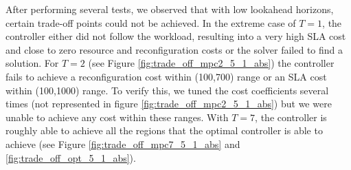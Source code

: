 After performing several tests, we observed that with low lookahead horizons, certain trade-off points could not be achieved.  In the extreme case of $T=1$, the controller either did not follow the workload, resulting into a very high SLA cost and close to zero resource and reconfiguration costs or the solver failed to find a solution. For $T=2$ (see Figure \ref{fig:trade_off_mpc2_5_1_abs}) the controller fails to achieve a reconfiguration cost within (100,700) range or an SLA cost  within (100,1000) range. 
To verify this, we tuned the cost coefficients several times (not represented in figure \ref{fig:trade_off_mpc2_5_1_abs}) but we were unable to achieve any cost within these ranges. 
 With $T=7$, the controller is roughly able to achieve all the regions that the optimal controller is able to achieve (see Figure \ref{fig:trade_off_mpc7_5_1_abs} and \ref{fig:trade_off_opt_5_1_abs}). %
%
%
